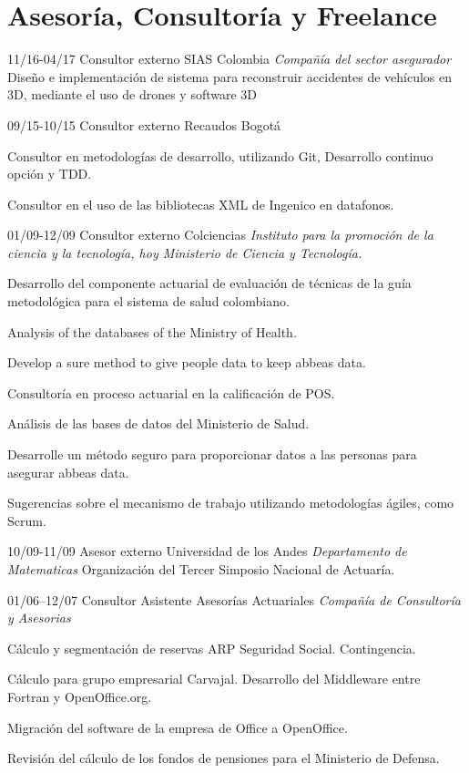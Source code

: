 \section{Asesoría, Consultoría y Freelance}
\begin{entrylist}

  \entry
	{11/16-04/17}
	{Consultor externo}
	{SIAS Colombia {\sl Compañía del sector asegurador}}
	{Diseño e implementación de sistema para reconstruir accidentes de vehículos en 3D,
	mediante el uso de drones y software 3D}

  \entry
	{09/15-10/15}
	{Consultor externo}
	{Recaudos Bogotá}
        {Consultor en metodologías de desarrollo, utilizando Git, Desarrollo continuo
opción y TDD.

	Consultor en el uso de las bibliotecas XML de Ingenico en datafonos.}

  \entry
	{01/09-12/09}
	{Consultor externo}
	{Colciencias {\sl Instituto para la promoción de la ciencia y la tecnología, hoy Ministerio de Ciencia y Tecnología.}}
        {Desarrollo del componente actuarial de evaluación de técnicas de la guía metodológica para
el sistema de salud colombiano.

Analysis of the databases of the Ministry of Health.

Develop a sure method to give people data to keep abbeas data.

Consultoría en proceso actuarial en la calificación de POS.

Análisis de las bases de datos del Ministerio de Salud.

Desarrolle un método seguro para proporcionar datos a las personas para asegurar abbeas data.

Sugerencias sobre el mecanismo de trabajo utilizando metodologías ágiles, como Scrum.}

  \entry
	{10/09-11/09}
	{Asesor externo}
	{Universidad de los Andes {\sl Departamento de Matematicas}}
	{Organización del Tercer Simposio Nacional de Actuaría.}

  \entry
	{01/06–12/07}
	{Consultor Asistente}
	{Asesorías Actuariales {\sl Compañía de Consultoría y Asesorias}}
	{Cálculo y segmentación de reservas ARP Seguridad Social. Contingencia.

Cálculo para grupo empresarial Carvajal. Desarrollo del Middleware
entre Fortran y OpenOffice.org.

Migración del software de la empresa de Office a OpenOffice.

Revisión del cálculo de los fondos de pensiones para el Ministerio de
Defensa.}

\end{entrylist}



